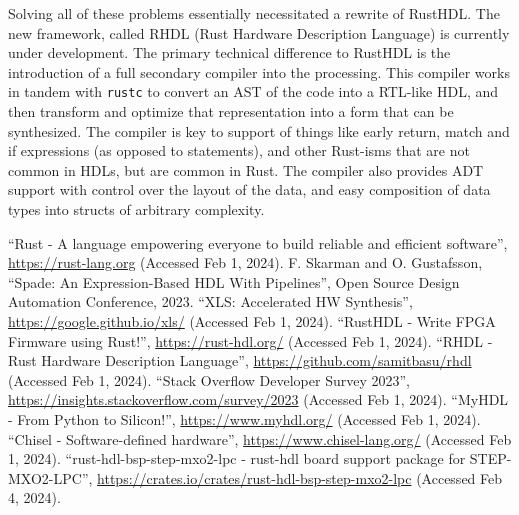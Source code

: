\documentclass[sigplan,screen,sigconf]{acmart}
\begin{document}
Solving all of these problems essentially necessitated a rewrite of RustHDL.  The new framework,
called RHDL (Rust Hardware Description Language) is currently under development.  The primary
technical difference to RustHDL is the introduction of a full secondary compiler into the processing.
This compiler works in tandem with \verb|rustc| to convert an AST of the code into a RTL-like
HDL, and then transform and optimize that representation into a form that can be synthesized.  The 
compiler is key to support of things like early return, match and if expressions (as opposed to statements),
and other Rust-isms that are not common in HDLs, but are common in Rust.  The compiler also provides
ADT support with control over the layout of the data, and easy composition of data types into structs
of arbitrary complexity.

\begin{thebibliography}{00}
   ``Rust - A language empowering everyone to build reliable and efficient software'', \url{https://rust-lang.org} (Accessed Feb 1, 2024).
   F. Skarman and O. Gustafsson, ``Spade: An Expression-Based HDL With Pipelines'', Open Source Design Automation Conference, 2023.
   ``XLS: Accelerated HW Synthesis'', \url{https://google.github.io/xls/} (Accessed Feb 1, 2024).
   ``RustHDL - Write FPGA Firmware using Rust!'', \url{https://rust-hdl.org/} (Accessed Feb 1, 2024).
   ``RHDL - Rust Hardware Description Language'', \url{https://github.com/samitbasu/rhdl} (Accessed Feb 1, 2024).
   ``Stack Overflow Developer Survey 2023'', \url{https://insights.stackoverflow.com/survey/2023} (Accessed Feb 1, 2024).
   ``MyHDL - From Python to Silicon!'', \url{https://www.myhdl.org/} (Accessed Feb 1, 2024).
   ``Chisel - Software-defined hardware'', \url{https://www.chisel-lang.org/} (Accessed Feb 1, 2024).
   ``rust-hdl-bsp-step-mxo2-lpc - rust-hdl board support package for STEP-MXO2-LPC'', \url{https://crates.io/crates/rust-hdl-bsp-step-mxo2-lpc} (Accessed Feb 4, 2024).
\end{thebibliography}
\end{document}
